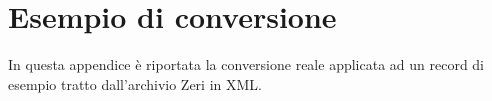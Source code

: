 \chapter{Esempio di conversione}

In questa appendice è riportata la conversione reale applicata ad un record di esempio tratto dall'archivio Zeri in XML.





